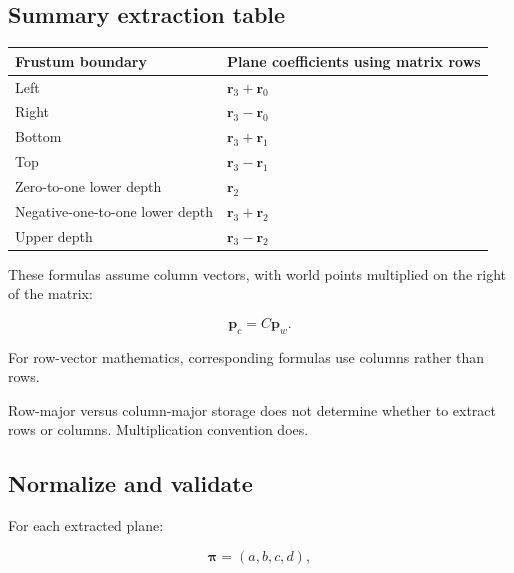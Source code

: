 \subsection{Summary extraction table}\label{02-foundations-ii-ch034-summary-extraction-table}

{\def\LTcaptype{none} %
\begin{longtable}[]{@{}
  >{\raggedright\arraybackslash}p{}
  >{\raggedright\arraybackslash}p{}@{}}
\toprule\noalign{}
\begin{minipage}[b]{\linewidth}\raggedright
Frustum boundary
\end{minipage} & \begin{minipage}[b]{\linewidth}\raggedright
Plane coefficients using matrix rows
\end{minipage} \\
\midrule\noalign{}
\endhead
\bottomrule\noalign{}
\endlastfoot
Left & \(\mathbf r_3+\mathbf r_0\) \\
Right & \(\mathbf r_3-\mathbf r_0\) \\
Bottom & \(\mathbf r_3+\mathbf r_1\) \\
Top & \(\mathbf r_3-\mathbf r_1\) \\
Zero-to-one lower depth & \(\mathbf r_2\) \\
Negative-one-to-one lower depth & \(\mathbf r_3+\mathbf r_2\) \\
Upper depth & \(\mathbf r_3-\mathbf r_2\) \\
\end{longtable}
}

These formulas assume column vectors, with world points multiplied on the right of the matrix:

\[
 \mathbf p_c=C\mathbf p_w.
\]

For row-vector mathematics, corresponding formulas use columns rather than rows.

Row-major versus column-major storage does not determine whether to extract rows or columns. Multiplication convention does.

\subsection{Normalize and validate}\label{02-foundations-ii-ch034-normalize-and-validate}

For each extracted plane:

\[
 \boldsymbol\pi=(a,b,c,d),
\]

